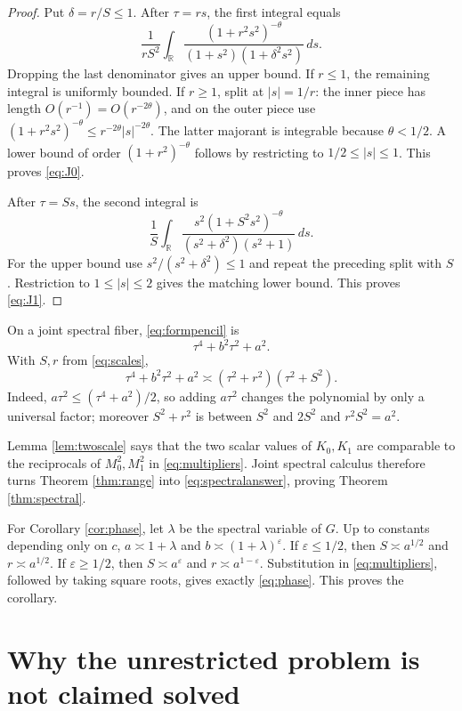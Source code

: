 \documentclass[11pt]{article}
\theoremstyle{remark}
\newcommand{\R}{\mathbb R}
\newcommand{\asympC}{\mathrel{\asymp}}
\begin{document}
\begin{proof}
Put $\delta=r/S\le1$.  After $\tau=rs$, the first integral equals
\[
 \frac1{rS^2}\int_{\R}
 \frac{(1+r^2s^2)^{-\theta}}
 {(1+s^2)(1+\delta^2s^2)}\,ds.
\]
Dropping the last denominator gives an upper bound.  If $r\le1$, the remaining
integral is uniformly bounded.  If $r\ge1$, split at $|s|=1/r$: the inner
piece has length $O(r^{-1})=O(r^{-2\theta})$, and on the outer piece use
$(1+r^2s^2)^{-\theta}\le r^{-2\theta}|s|^{-2\theta}$.  The latter majorant is
integrable because $\theta<1/2$.  A lower bound of order
$(1+r^2)^{-\theta}$ follows by restricting to $1/2\le|s|\le1$.  This proves
\eqref{eq:J0}.

After $\tau=Ss$, the second integral is
\[
 \frac1S\int_{\R}
 \frac{s^2(1+S^2s^2)^{-\theta}}
 {(s^2+\delta^2)(s^2+1)}\,ds.
\]
For the upper bound use $s^2/(s^2+\delta^2)\le1$ and repeat the preceding
split with $S$.  Restriction to $1\le|s|\le2$ gives the matching lower bound.
This proves \eqref{eq:J1}.
\end{proof}

On a joint spectral fiber, \eqref{eq:formpencil} is
\[
 \tau^4+b^2\tau^2+a^2.
\]
With $S,r$ from \eqref{eq:scales},
\begin{equation}\label{eq:factorcompare}
 \tau^4+b^2\tau^2+a^2
 \asympC(\tau^2+r^2)(\tau^2+S^2).
\end{equation}
Indeed, $a\tau^2\le(\tau^4+a^2)/2$, so adding $a\tau^2$ changes the
polynomial by only a universal factor; moreover
$S^2+r^2$ is between $S^2$ and $2S^2$ and $r^2S^2=a^2$.

Lemma \ref{lem:twoscale} says that the two scalar values of $K_0,K_1$ are
comparable to the reciprocals of $M_0^2,M_1^2$ in
\eqref{eq:multipliers}.  Joint spectral calculus therefore turns
Theorem \ref{thm:range} into \eqref{eq:spectralanswer}, proving
Theorem \ref{thm:spectral}.

For Corollary \ref{cor:phase}, let $\lambda$ be the spectral variable of $G$.
Up to constants depending only on $c$,
$a\asympC1+\lambda$ and $b\asympC(1+\lambda)^\varepsilon$.  If
$\varepsilon\le1/2$, then
$S\asympC a^{1/2}$ and $r\asympC a^{1/2}$.  If
$\varepsilon\ge1/2$, then
$S\asympC a^\varepsilon$ and $r\asympC a^{1-\varepsilon}$.
Substitution in \eqref{eq:multipliers}, followed by taking square roots,
gives exactly \eqref{eq:phase}.  This proves the corollary.

\section{Why the unrestricted problem is not claimed solved}
\end{document}
